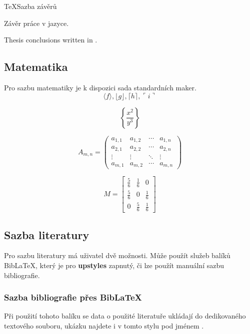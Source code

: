 \documentclass[
  master=false                %
  font=sans,                  %
  printversion=false,         %
  joinlists=true,             %
  glossaries=true,            %
  figures=true,               %
  tables=true,                %
  sourcecodes=true,					  %
  theorems=true,						  %
  bibencoding=utf8,           %
  language=czech,             %
  encoding=utf8,              %
  field=inf,                  %
  index=true,                 %
]{updiplom}
\begin{document}
\begin{upcode}{TeX}{}{Sazba závěrů}
\begin{upconclusions}
Závěr práce v  jazyce.
\end{upconclusions}

\begin{upconclusions}[english]
Thesis conclusions written in .
\end{upconclusions}
\end{upcode}

\subsection{Matematika}
Pro sazbu matematiky je k dispozici sada standardních maker.
$$\langle f \rangle, \lfloor g \rfloor,
\lceil h \rceil, \ulcorner i \urcorner$$

$$\left\{\frac{x^2}{y^3}\right\}$$

$$
A_{m,n} =
 \begin{pmatrix}
  a_{1,1} & a_{1,2} & \cdots & a_{1,n} \\
  a_{2,1} & a_{2,2} & \cdots & a_{2,n} \\
  \vdots  & \vdots  & \ddots & \vdots  \\
  a_{m,1} & a_{m,2} & \cdots & a_{m,n}
 \end{pmatrix}
$$

$$
M = \begin{bmatrix}
       \frac{5}{6} & \frac{1}{6} & 0           \\[0.3em]
       \frac{5}{6} & 0           & \frac{1}{6} \\[0.3em]
       0           & \frac{5}{6} & \frac{1}{6}
     \end{bmatrix}
$$

\subsection{Sazba literatury}
Pro sazbu literatury má uživatel dvě možnosti. Může použít služeb balíků Bib\LaTeX{}, který je pro \textbf{upstyles} zapnutý, či lze použít manuální sazbu bibliografie.
\subsubsection{Sazba bibliografie přes Bib\LaTeX{}}
Při použití tohoto balíku se data o použité literatuře ukládají do dedikovaného textového souboru, ukázku najdete i v tomto stylu pod jménem .
\end{document}
